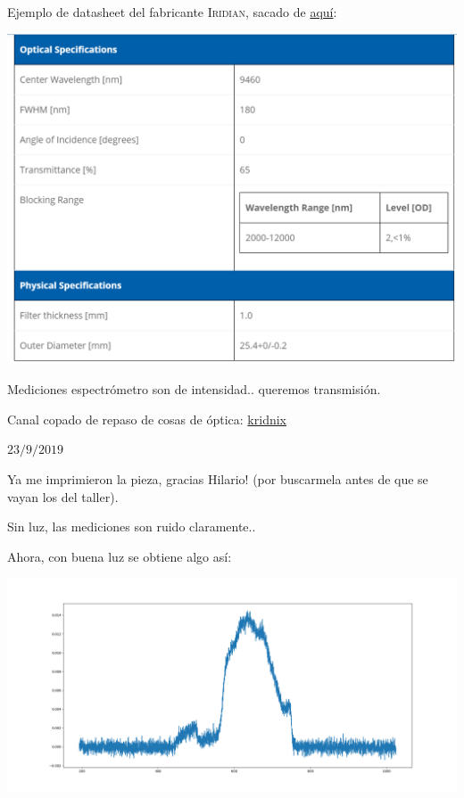 \documentclass[12pt,dvipsnames]{exam}
\begin{document}
Ejemplo de datasheet del fabricante \textsc{Iridian}, sacado de \href{https://www.iridian.ca/product/bpf-9460-180/}{aquí}:

\begin{center}
	\includegraphics[scale=0.8]{imgs/datasheet_modelo.png}
\end{center}

Mediciones espectrómetro son de intensidad.. queremos transmisión.

Canal copado de repaso de cosas de óptica: \href{https://www.youtube.com/user/kridnix/videos}{kridnix}

\newpage
\hrulefill

$23/9/2019$

Ya me imprimieron la pieza, gracias Hilario! (por buscarmela antes de que se vayan los del taller).


Sin luz, las mediciones son ruido claramente..

Ahora, con buena luz se obtiene algo así:

\begin{center}
	\includegraphics[scale=0.4]{imgs/med23del91.png}
\end{center}
\end{document}
